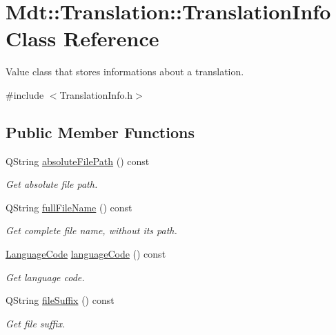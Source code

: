 \hypertarget{class_mdt_1_1_translation_1_1_translation_info}{}\section{Mdt\+:\+:Translation\+:\+:Translation\+Info Class Reference}
\label{class_mdt_1_1_translation_1_1_translation_info}


Value class that stores informations about a translation.  




{\ttfamily \#include $<$Translation\+Info.\+h$>$}

\subsection*{Public Member Functions}
\begin{DoxyCompactItemize}
\item 
Q\+String \hyperlink{class_mdt_1_1_translation_1_1_translation_info_a38695fb8434cd7c149811399d669bf23}{absolute\+File\+Path} () const \hypertarget{class_mdt_1_1_translation_1_1_translation_info_a38695fb8434cd7c149811399d669bf23}{}\label{class_mdt_1_1_translation_1_1_translation_info_a38695fb8434cd7c149811399d669bf23}

\begin{DoxyCompactList}\small\item\em Get absolute file path. \end{DoxyCompactList}\item 
Q\+String \hyperlink{class_mdt_1_1_translation_1_1_translation_info_a5405c3ee8a0a8466bcc472da526022dc}{full\+File\+Name} () const \hypertarget{class_mdt_1_1_translation_1_1_translation_info_a5405c3ee8a0a8466bcc472da526022dc}{}\label{class_mdt_1_1_translation_1_1_translation_info_a5405c3ee8a0a8466bcc472da526022dc}

\begin{DoxyCompactList}\small\item\em Get complete file name, without its path. \end{DoxyCompactList}\item 
\hyperlink{class_mdt_1_1_translation_1_1_language_code}{Language\+Code} \hyperlink{class_mdt_1_1_translation_1_1_translation_info_a1a3ec9b9edc3438c6120d365785cbb05}{language\+Code} () const 
\begin{DoxyCompactList}\small\item\em Get language code. \end{DoxyCompactList}\item 
Q\+String \hyperlink{class_mdt_1_1_translation_1_1_translation_info_a08e38cca61e807944db66457413e731b}{file\+Suffix} () const 
\begin{DoxyCompactList}\small\item\em Get file suffix. \end{DoxyCompactList}\end{DoxyCompactItemize}
